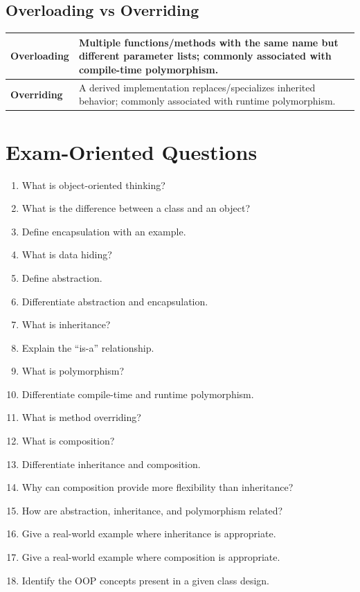 \documentclass[11pt,a4paper]{article}
\begin{document}
\subsection{Overloading vs Overriding}

\begin{tabularx}{\textwidth}{|p{}|X|}
\hline
\textbf{Overloading} & Multiple functions/methods with the same name but different parameter lists; commonly associated with compile-time polymorphism.\\
\hline
\textbf{Overriding} & A derived implementation replaces/specializes inherited behavior; commonly associated with runtime polymorphism.\\
\hline
\end{tabularx}

\section{Exam-Oriented Questions}

\begin{enumerate}
    \item What is object-oriented thinking?
    \item What is the difference between a class and an object?
    \item Define encapsulation with an example.
    \item What is data hiding?
    \item Define abstraction.
    \item Differentiate abstraction and encapsulation.
    \item What is inheritance?
    \item Explain the ``is-a'' relationship.
    \item What is polymorphism?
    \item Differentiate compile-time and runtime polymorphism.
    \item What is method overriding?
    \item What is composition?
    \item Differentiate inheritance and composition.
    \item Why can composition provide more flexibility than inheritance?
    \item How are abstraction, inheritance, and polymorphism related?
    \item Give a real-world example where inheritance is appropriate.
    \item Give a real-world example where composition is appropriate.
    \item Identify the OOP concepts present in a given class design.
\end{enumerate}
\end{document}
